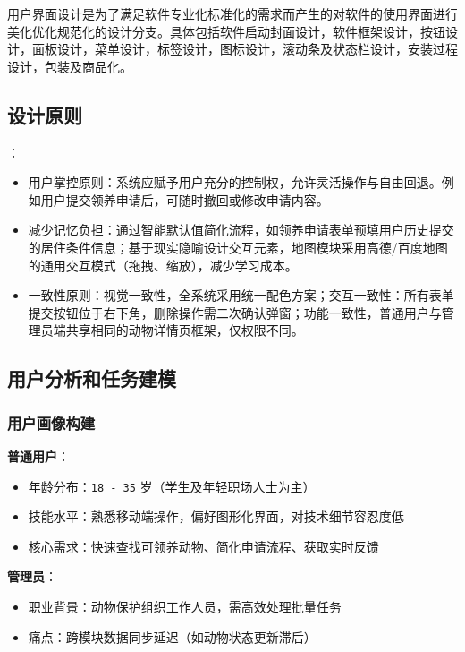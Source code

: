 \documentclass[12pt,a4paper,UTF8]{article}
\begin{document}
用户界面设计是为了满足软件专业化标准化的需求而产生的对软件的使用界面进行美化优化规范化的设计分支。具体包括软件启动封面设计，软件框架设计，按钮设计，面板设计，菜单设计，标签设计，图标设计，滚动条及状态栏设计，安装过程设计，包装及商品化。

\subsection{设计原则}

：

\begin{itemize}
  \item 用户掌控原则：系统应赋予用户充分的控制权，允许灵活操作与自由回退。例如用户提交领养申请后，可随时撤回或修改申请内容。
  \item 减少记忆负担：通过智能默认值简化流程，如领养申请表单预填用户历史提交的居住条件信息；基于现实隐喻设计交互元素，地图模块采用高德/百度地图的通用交互模式（拖拽、缩放），减少学习成本。
  \item 一致性原则：视觉一致性，全系统采用统一配色方案；交互一致性：所有表单提交按钮位于右下角，删除操作需二次确认弹窗；功能一致性，普通用户与管理员端共享相同的动物详情页框架，仅权限不同。
\end{itemize}

\subsection{用户分析和任务建模}

\subsubsection{用户画像构建}

\noindent\textbf{普通用户}：

\begin{itemize}
  \item 年龄分布：\verb|18 - 35| 岁（学生及年轻职场人士为主）
  \item 技能水平：熟悉移动端操作，偏好图形化界面，对技术细节容忍度低
  \item 核心需求：快速查找可领养动物、简化申请流程、获取实时反馈
\end{itemize}

\noindent\textbf{管理员}：

\begin{itemize}
  \item 职业背景：动物保护组织工作人员，需高效处理批量任务
  \item 痛点：跨模块数据同步延迟（如动物状态更新滞后）
\end{itemize}
\end{document}

